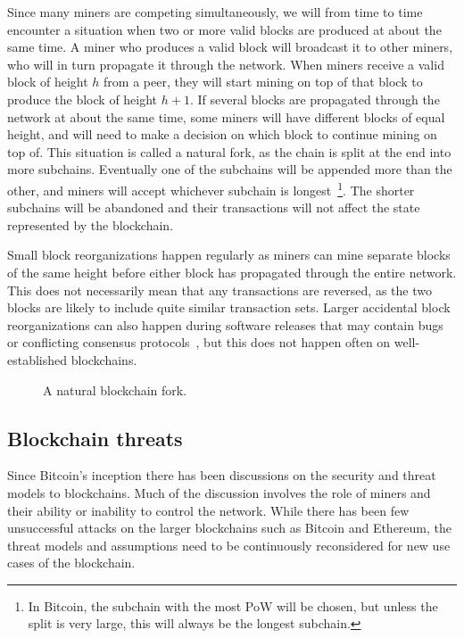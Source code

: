 Since many miners are competing simultaneously, we will from time to time encounter a situation when two or more valid blocks are produced at about the same time. A miner who produces a valid block will broadcast it to other miners, who will in turn propagate it through the network. When miners receive a valid block of height $h$ from a peer, they will start mining on top of that block to produce the block of height $h+1$. If several blocks are propagated through the network at about the same time, some miners will have different blocks of equal height, and will need to make a decision on which block to continue mining on top of. This situation is called a natural fork, as the chain is split at the end into more subchains. Eventually one of the subchains will be appended more than the other, and miners will accept whichever subchain is longest~\footnote{In Bitcoin, the subchain with the most PoW will be chosen, but unless the split is very large, this will always be the longest subchain.}. The shorter subchains will be abandoned and their transactions will not affect the state represented by the blockchain.

Small block reorganizations happen regularly as miners can mine separate blocks of the same height before either block has propagated through the entire network. This does not necessarily mean that any transactions are reversed, as the two blocks are likely to include quite similar transaction sets. Larger accidental block reorganizations can also happen during software releases that may contain bugs or conflicting consensus protocols~\cite{andresen_march_2013}, but this does not happen often on well-established blockchains.

\begin{figure}[htbp]
  \centering
  
  \caption{A natural blockchain fork.}
  \label{fig:blockchain-fork}
\end{figure}


\subsection{Blockchain threats}

Since Bitcoin's inception there has been discussions on the security and threat models to blockchains. Much of the discussion involves the role of miners and their ability or inability to control the network. While there has been few unsuccessful attacks on the larger blockchains such as Bitcoin and Ethereum, the threat models and assumptions need to be continuously reconsidered for new use cases of the blockchain.

